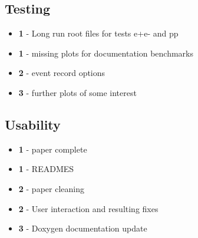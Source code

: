 \documentclass[]{Photos_interface_design}
\begin{document}
\subsection*{Testing}
\begin{itemize}
  \item[\ding{111}]{\bf 1} - Long run root files for tests e+e- and pp
  \item[\ding{111}]{\bf 1} - missing plots for documentation benchmarks
  \item[\ding{111}]{\bf 2} - event record options
  \item[\ding{111}]{\bf 3} - further plots of some interest
\end{itemize}

\subsection*{Usability}
\begin{itemize}
  \item[\ding{111}]{\bf 1} - paper complete
  \item[\ding{111}]{\bf 1} - READMES 
  \item[\ding{111}]{\bf 2} - paper cleaning
  \item[\ding{111}]{\bf 2} - User interaction and resulting fixes
  \item[\ding{111}]{\bf 3} - Doxygen documentation update
\end{itemize}
\end{document}
